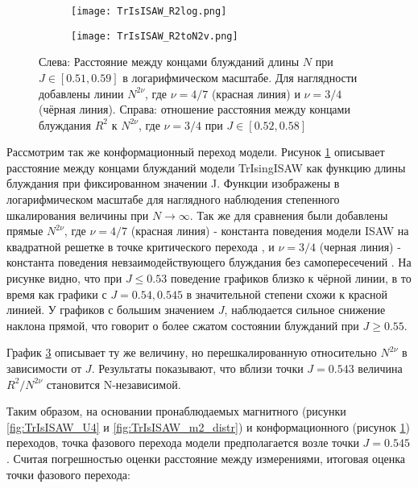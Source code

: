 \begin{figure}[h]
\begin{subfigure}{0.49\textwidth}
\texttt{[image: TrIsISAW\_R2log.png]}
\caption{}
\label{fig:TrIsISAW_R2log}
\end{subfigure}
\hfill
\begin{subfigure}{0.49\textwidth}
\texttt{[image: TrIsISAW\_R2toN2v.png]}
\caption{}
\label{fig:TrIsISAW_R2toN2v}
\end{subfigure}
\caption{Слева: Расстояние между концами блужданий длины $N$ при $J \in [0.51,0.59]$ в логарифмическом масштабе. 
Для наглядности добавлены линии $N^{2\nu}$, где $\nu = 4/7$ (красная линия) и $\nu=3/4$ (чёрная линия).
Справа: отношение расстояния между концами блуждания $R^2$ к $N^{2\nu}$, где $\nu=3/4$ при $J \in [0.52,0.58]$}
\end{figure}

Рассмотрим так же конформационный переход модели.
Рисунок \ref{fig:TrIsISAW_R2log} описывает расстояние между концами блужданий модели TrIsingISAW как функцию длины блуждания при фиксированном значении J.
Функции изображены в логарифмическом масштабе для наглядного наблюдения степенного шкалирования величины при $N \to \infty$.
Так же для сравнения были добавлены прямые $N^{2\nu}$, где $\nu = 4/7$ (красная линия) - константа поведения модели ISAW на квадратной решетке в точке критического перехода \cite{Duplantier1987},
и $\nu = 3/4$ (черная линия) - константа поведения невзаимодействующего блуждания без самопересечений \cite{Rensburg2015}.
На рисунке видно, что при $J \leq 0.53$ поведение графиков близко к чёрной линии, в то время как графики с $J = 0.54, 0.545$ в значительной степени схожи к красной линией.
У графиков с большим значением $J$, наблюдается сильное снижение наклона прямой, что говорит о более сжатом состоянии блужданий при $J \geq 0.55$.  

График \ref{fig:TrIsISAW_R2toN2v} описывает ту же величину, но перешкалированную относительно $N^{2\nu}$ в зависимости от $J$.
Результаты показывают, что вблизи точки $J = 0.543$ величина $R^2 / N^{2\nu}$ становится N-независимой. 

Таким образом, на основании пронаблюдаемых магнитного (рисунки \ref{fig:TrIsISAW_U4} и \ref{fig:TrIsISAW_m2_distr}) и конформационного (рисунок \ref{fig:TrIsISAW_R2log}) переходов,
точка фазового перехода модели предполагается возле точки $J=0.545$. Считая погрешностью оценки расстояние между измерениями, итоговая оценка точки фазового перехода:


